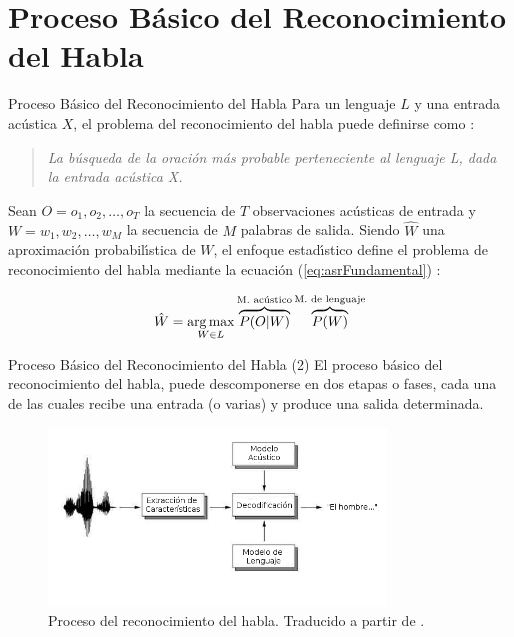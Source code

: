 \section{Proceso B\'asico del Reconocimiento del Habla}

\begin{frame}{Proceso B\'asico del Reconocimiento del Habla}
Para un lenguaje $L$ y una entrada ac\'ustica $X$, el problema del reconocimiento del habla puede 
definirse como \cite{Jurafsky}:

\begin{quote}
\emph{La b\'usqueda de la oraci\'on m\'as probable perteneciente al lenguaje L, dada la entrada ac\'ustica X.}
\end{quote}

Sean $O = o_1,o_2,\ldots,o_T$ la secuencia de $T$ observaciones ac\'usticas de entrada y 
$W  = w_1,w_2,\ldots,w_M$ la secuencia de $M$ palabras de salida. Siendo $\hat{W}$ una aproximaci\'on 
probabil{\'\i}stica de $W$, el enfoque estad{\'\i}stico define el problema de reconocimiento del habla 
mediante la ecuaci\'on (\ref{eq:asrFundamental}) \cite{Jurafsky}:

\begin{align}
\hat{W} = \operatorname*{arg\,max}_{W \in L} \overbrace{P(O|W)}^\text{M. ac\'ustico}\overbrace{P(W)}^\text{M. de lenguaje}
\label{eq:asrFundamental}
\end{align}
\end{frame}

\begin{frame}{Proceso B\'asico del Reconocimiento del Habla (2)}
El proceso b\'asico del reconocimiento del habla, puede descomponerse en dos etapas o fases, 
cada una de las cuales recibe una entrada (o varias) y produce una salida determinada.

\begin{figure}[H] 
\centering
\includegraphics[width=0.8\textwidth]{./graphics/proceso.png}
\caption{Proceso del reconocimiento del habla. Traducido a partir de \protect\cite{VerenichASR}.}
\label{figure:proceso}
\end{figure}
\end{frame}


